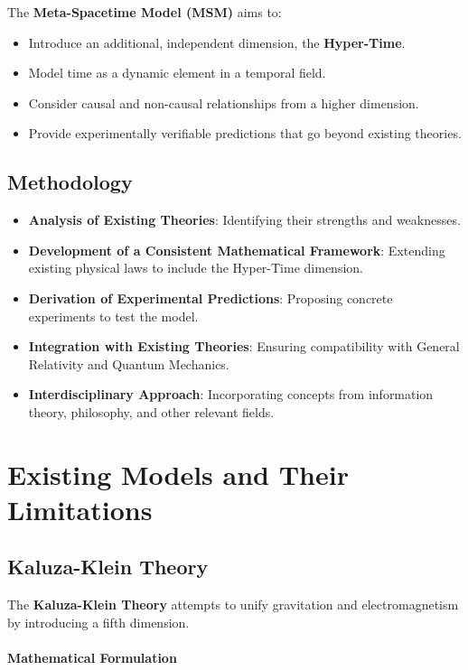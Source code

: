 \documentclass[11pt,a4paper]{article}
\begin{document}
The \textbf{Meta-Spacetime Model (MSM)} aims to:

\begin{itemize}
    \item Introduce an additional, independent dimension, the \textbf{Hyper-Time}.
    \item Model time as a dynamic element in a temporal field.
    \item Consider causal and non-causal relationships from a higher dimension.
    \item Provide experimentally verifiable predictions that go beyond existing theories.
\end{itemize}

\subsection{Methodology}

\begin{itemize}
    \item \textbf{Analysis of Existing Theories}: Identifying their strengths and weaknesses.
    \item \textbf{Development of a Consistent Mathematical Framework}: Extending existing physical laws to include the Hyper-Time dimension.
    \item \textbf{Derivation of Experimental Predictions}: Proposing concrete experiments to test the model.
    \item \textbf{Integration with Existing Theories}: Ensuring compatibility with General Relativity and Quantum Mechanics.
    \item \textbf{Interdisciplinary Approach}: Incorporating concepts from information theory, philosophy, and other relevant fields.
\end{itemize}

\section{Existing Models and Their Limitations}

\subsection{Kaluza-Klein Theory}

The \textbf{Kaluza-Klein Theory} attempts to unify gravitation and electromagnetism by introducing a fifth dimension.

\paragraph{Mathematical Formulation}
\end{document}
